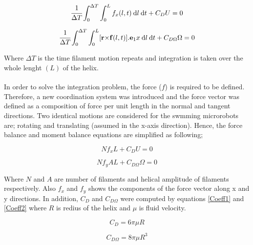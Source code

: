 \documentclass[12pt,a4paper,titlepage]{report}
\begin{document}
\begin{equation}
  \cfrac {1} {\Delta T} \int_0^{\Delta T} \int_0^L  f_x(l,t)\: \mathrm{d}l \:\mathrm{d}t + C_DU  = 0
\label{thrust_1}
\end{equation}

\begin{equation}
  \cfrac {1} {\Delta T}  \int_0^{\Delta T} \int_0^L [\bold r \bold \times \bold f(l,t)] . \bold e_1x \: \mathrm{d}l \:\mathrm{d}t + C_{D\Omega}\Omega= 0
\label{torque_1}
\end{equation}

Where $\Delta T$ is the time filament motion repeats and integration is taken over the whole lenght $(L)$ of the
helix. 

\paragraph{}
In order to solve the integration problem, the force ($f$) is required to be defined. Therefore, a new
coordination system was introduced and the force vector was defined as a composition of force per unit length
in the normal and tangent directions. Two identical motions are considered for the swmming microrobots
are; rotating and translating (assumed in the x-axis direction). Hence, the force balance and moment balance 
equations are simplified as following; 


\begin{equation}
Nf_xL  + C_DU  = 0
\label{simple_thrust}
\end{equation}



\begin{equation}
 Nf_yAL + C_{D\Omega}\Omega= 0
\label{simple_torque}
\end{equation}

Where $N$ and $A$ are number of filaments and helical amplitude of filaments respectively. Also $f_x$ and 
$f_y$ shows the components of the force vector along x and y directions. In addition, $C_D$ and $C_{D\Omega}$
were computed by equations \ref{Coeff1} and \ref{Coeff2} where $R$ is redius of the helix and $\mu$ is fluid velocity.


\begin{equation}
 C_D  = 6 \pi \mu R
\label{Coeff1}
\end{equation}



\begin{equation}
 C_{D\Omega}= 8 \pi \mu R^3
\label{Coeff2}
\end{equation}
\end{document}
